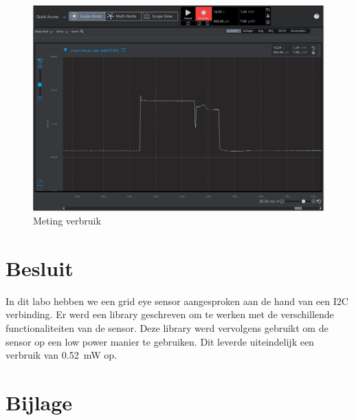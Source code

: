\documentclass[]{article}
\begin{document}
 



\begin{figure}[h!]
	\centering
	\includegraphics[width=\columnwidth]{final_energy_consumption.png}
	\caption{Meting verbruik}
	\label{fig:meting}
\end{figure}





\newpage
\section{Besluit }
In dit labo hebben we een grid eye sensor aangesproken aan de hand van een I2C verbinding. Er werd een library geschreven om te werken met de verschillende functionaliteiten van de sensor. Deze library werd vervolgens gebruikt om de sensor op een low power manier te gebruiken. Dit leverde uiteindelijk een verbruik van 0.52~mW op. 



\newpage
\section*{Bijlage}



\newpage

\newpage

\end{document}
